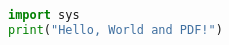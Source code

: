 \documentclass{article}
\begin{document}
\begin{lstlisting}[language=Python]
import sys
print("Hello, World and PDF!")
\end{lstlisting}
\end{document}
